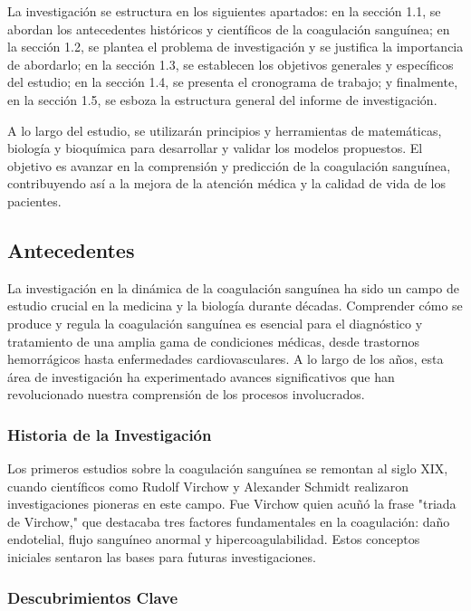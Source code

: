 \documentclass{article}
\begin{document}
La investigación se estructura en los siguientes apartados: en la sección 1.1, se abordan los antecedentes históricos y científicos de la coagulación sanguínea; en la sección 1.2, se plantea el problema de investigación y se justifica la importancia de abordarlo; en la sección 1.3, se establecen los objetivos generales y específicos del estudio; en la sección 1.4, se presenta el cronograma de trabajo; y finalmente, en la sección 1.5, se esboza la estructura general del informe de investigación.

A lo largo del estudio, se utilizarán principios y herramientas de matemáticas, biología y bioquímica para desarrollar y validar los modelos propuestos. El objetivo es avanzar en la comprensión y predicción de la coagulación sanguínea, contribuyendo así a la mejora de la atención médica y la calidad de vida de los pacientes.
\subsection{Antecedentes}

La investigación en la dinámica de la coagulación sanguínea ha sido un campo de estudio crucial en la medicina y la biología durante décadas. Comprender cómo se produce y regula la coagulación sanguínea es esencial para el diagnóstico y tratamiento de una amplia gama de condiciones médicas, desde trastornos hemorrágicos hasta enfermedades cardiovasculares. A lo largo de los años, esta área de investigación ha experimentado avances significativos que han revolucionado nuestra comprensión de los procesos involucrados.

\subsubsection{Historia de la Investigación}

Los primeros estudios sobre la coagulación sanguínea se remontan al siglo XIX, cuando científicos como Rudolf Virchow y Alexander Schmidt realizaron investigaciones pioneras en este campo. Fue Virchow quien acuñó la frase "triada de Virchow," que destacaba tres factores fundamentales en la coagulación: daño endotelial, flujo sanguíneo anormal y hipercoagulabilidad. Estos conceptos iniciales sentaron las bases para futuras investigaciones.

\subsubsection{Descubrimientos Clave}
\end{document}
